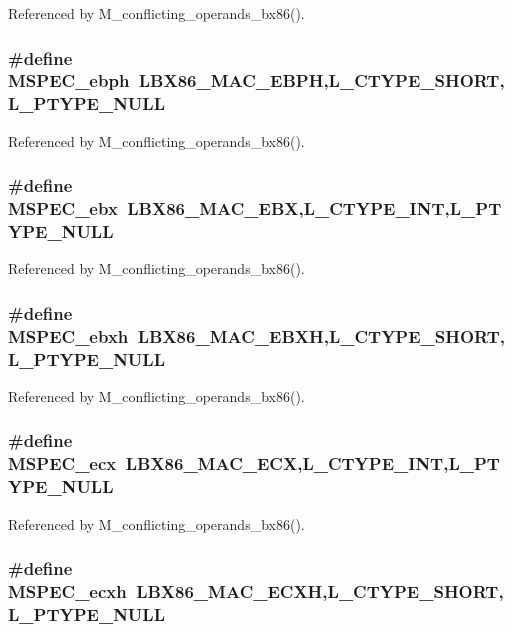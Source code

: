 Referenced by M\_\-conflicting\_\-operands\_\-bx86().
\subsubsection{\setlength{\rightskip}{0pt plus 5cm}\#define MSPEC\_\-ebph~LBX86\_\-MAC\_\-EBPH,L\_\-CTYPE\_\-SHORT,L\_\-PTYPE\_\-NULL}\label{ml__bx86_8c_11ee5709604054d5dba016bcac6d4ce0}




Referenced by M\_\-conflicting\_\-operands\_\-bx86().
\subsubsection{\setlength{\rightskip}{0pt plus 5cm}\#define MSPEC\_\-ebx~LBX86\_\-MAC\_\-EBX,L\_\-CTYPE\_\-INT,L\_\-PTYPE\_\-NULL}\label{ml__bx86_8c_1b9367febeefe27ba356793be5f3919c}




Referenced by M\_\-conflicting\_\-operands\_\-bx86().
\subsubsection{\setlength{\rightskip}{0pt plus 5cm}\#define MSPEC\_\-ebxh~LBX86\_\-MAC\_\-EBXH,L\_\-CTYPE\_\-SHORT,L\_\-PTYPE\_\-NULL}\label{ml__bx86_8c_c03a10f2bbfdb293d499f82345a8be07}




Referenced by M\_\-conflicting\_\-operands\_\-bx86().
\subsubsection{\setlength{\rightskip}{0pt plus 5cm}\#define MSPEC\_\-ecx~LBX86\_\-MAC\_\-ECX,L\_\-CTYPE\_\-INT,L\_\-PTYPE\_\-NULL}\label{ml__bx86_8c_02851894e614f602847dbc319cd9c93c}




Referenced by M\_\-conflicting\_\-operands\_\-bx86().
\subsubsection{\setlength{\rightskip}{0pt plus 5cm}\#define MSPEC\_\-ecxh~LBX86\_\-MAC\_\-ECXH,L\_\-CTYPE\_\-SHORT,L\_\-PTYPE\_\-NULL}\label{ml__bx86_8c_5f5a9ae1763b0d80808239dd3a136869}




